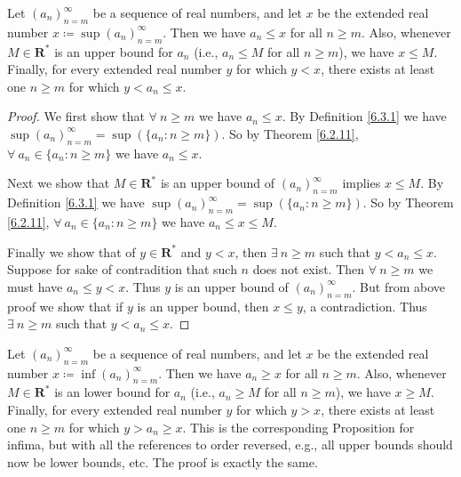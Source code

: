\setcounter{theorem}{5}
\begin{proposition}\label{6.3.6}
    Let \((a_n)_{n = m}^\infty\) be a sequence of real numbers, and let \(x\) be the extended real number \(x \coloneqq \sup(a_n)_{n = m}^\infty\).
    Then we have \(a_n \leq x\) for all \(n \geq m\).
    Also, whenever \(M \in \mathbf{R}^*\) is an upper bound for \(a_n\) (i.e., \(a_n \leq M\) for all \(n \geq m\)), we have \(x \leq M\).
    Finally, for every extended real number \(y\) for which \(y < x\), there exists at least one \(n \geq m\) for which \(y < a_n \leq x\).
\end{proposition}

\begin{proof}
    We first show that \(\forall\ n \geq m\) we have \(a_n \leq x\).
    By Definition \ref{6.3.1} we have \(\sup(a_n)_{n = m}^\infty = \sup(\{a_n : n \geq m\})\).
    So by Theorem \ref{6.2.11}, \(\forall\ a_n \in \{a_n : n \geq m\}\) we have \(a_n \leq x\).

    Next we show that \(M \in \mathbf{R}^*\) is an upper bound of \((a_n)_{n = m}^\infty\) implies \(x \leq M\).
    By Definition \ref{6.3.1} we have \(\sup(a_n)_{n = m}^\infty = \sup(\{a_n : n \geq m\})\).
    So by Theorem \ref{6.2.11}, \(\forall\ a_n \in \{a_n : n \geq m\}\) we have \(a_n \leq x \leq M\).

    Finally we show that of \(y \in \mathbf{R}^*\) and \(y < x\), then \(\exists\ n \geq m\) such that \(y < a_n \leq x\).
    Suppose for sake of contradition that such \(n\) does not exist.
    Then \(\forall\ n \geq m\) we must have \(a_n \leq y < x\).
    Thus \(y\) is an upper bound of \((a_n)_{n = m}^\infty\).
    But from above proof we show that if \(y\) is an upper bound, then \(x \leq y\), a contradiction.
    Thus \(\exists\ n \geq m\) such that \(y < a_n \leq x\).
\end{proof}

\begin{remark}\label{6.3.7}
    Let \((a_n)_{n = m}^\infty\) be a sequence of real numbers, and let \(x\) be the extended real number \(x \coloneqq \inf(a_n)_{n = m}^\infty\).
    Then we have \(a_n \geq x\) for all \(n \geq m\).
    Also, whenever \(M \in \mathbf{R}^*\) is an lower bound for \(a_n\) (i.e., \(a_n \geq M\) for all \(n \geq m\)), we have \(x \geq M\).
    Finally, for every extended real number \(y\) for which \(y > x\), there exists at least one \(n \geq m\) for which \(y > a_n \geq x\).
    This is the corresponding Proposition for infima, but with all the references to order reversed, e.g., all upper bounds should now be lower bounds, etc.
    The proof is exactly the same.
\end{remark}

